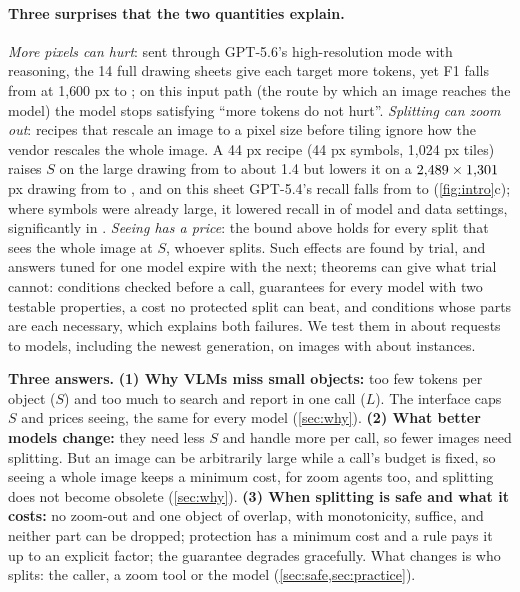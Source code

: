 \paragraph{Three surprises that the two quantities explain.}
\emph{More pixels can hurt}: sent through GPT-5.6's high-resolution mode with reasoning, the 14 full drawing sheets give each target more tokens, yet F1 falls from \XnFAOneRgptFiveSixSheets{} at 1{,}600 px to \XnFNATRgptFiveSixSheets; on this input path (the route by which an image reaches the model) the model stops satisfying ``more tokens do not hurt''. \emph{Splitting can zoom out}: recipes that rescale an image to a pixel size before tiling ignore how the vendor rescales the whole image. A 44 px recipe (44 px symbols, 1{,}024 px tiles) raises $S$ on the large drawing from \CfigSwhole{} to about 1.4 but lowers it on a $2{,}489{} \times 1{,}301$ px drawing from \CsmallSw{} to \CsmallSt, and on this sheet GPT-5.4's recall falls from \CsmallRecWhole{} to \CsmallRecTile{} (\cref{fig:intro}c); where symbols were already large, it lowered recall in \XtcOutNegPoint{} of \XtcOutN{} model and data settings, significantly in \XtcOutNeg. \emph{Seeing has a price}: the bound above holds for every split that sees the whole image at $S$, whoever splits. Such effects are found by trial, and answers tuned for one model expire with the next; theorems can give what trial cannot: conditions checked before a call, guarantees for every model with two testable properties, a cost no protected split can beat, and conditions whose parts are each necessary, which explains both failures. We test them in about \CscaleCalls{} requests to \CscaleModels{} models, including the newest generation, on \CscaleImages{} images with about \CscaleInst{} instances.

\begin{answerbox}
\textbf{Three answers.}
\textbf{(1) Why VLMs miss small objects:} too few tokens per object ($S$) and too much to search and report in one call ($L$). The interface caps $S$ and prices seeing, the same for every model (\cref{sec:why}).
\textbf{(2) What better models change:} they need less $S$ and handle more per call, so fewer images need splitting. But an image can be arbitrarily large while a call's budget is fixed, so seeing a whole image keeps a minimum cost, for zoom agents too, and splitting does not become obsolete (\cref{sec:why}).
\textbf{(3) When splitting is safe and what it costs:} no zoom-out and one object of overlap, with monotonicity, suffice, and neither part can be dropped; protection has a minimum cost and a rule pays it up to an explicit factor; the guarantee degrades gracefully. What changes is who splits: the caller, a zoom tool or the model (\cref{sec:safe,sec:practice}).
\end{answerbox}

